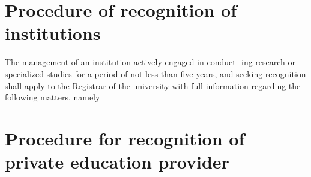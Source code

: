 \documentclass[default]{mhact}
\begin{document}
      \section{Procedure of recognition of institutions}
      

      \begin{subsectionlist}
    

The management of an institution actively engaged in conduct- ing research or specialized studies for a period of not less than five years, and seeking recognition shall apply to the Registrar of the university with full information regarding the following matters, namely

       \end{subsectionlist}
    
      \section{Procedure for recognition of private education provider}
      
\end{document}
